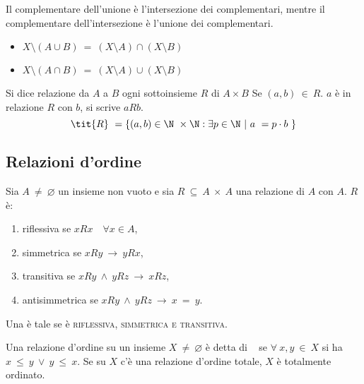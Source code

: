 \documentclass[../analisi.tex]{subfiles}
\begin{document}
\begin{esem}

Il complementare dell'unione è l'intersezione dei complementari, mentre il complementare dell'intersezione è l'unione dei complementari.

	\begin{itemize}
	\item $ X \setminus (A \cup B)\ =\ (X \setminus A) \cap(X \setminus B) $
	\item $ X \setminus (A \cap B)\ =\ (X \setminus A) \cup (X \setminus B) $
        \end{itemize}
\end{esem}

\begin{dimo}
	Si dice relazione da $A$ a $B$ ogni sottoinsieme $R$ di $A\times B$ Se $(a,b)\ \in\ R$.
	$a$ è in relazione $R$ con $b$, si scrive $aRb$. 
	\begin{equation} 
	\tit{R}\ = \{ (a,b) \in \N\ \times \N: \exists p \in \N\ |\ a\ = p \cdot b\ \}
	\end{equation}
\end{dimo}

\subsection{Relazioni d'ordine}
Sia $A\ \neq\ \varnothing$ un insieme non vuoto e sia $R\ \subseteq\ A\ \times\ A$ una relazione di $A$ con $A$. $R$ è:

\begin{enumerate}
	\item riflessiva se $xRx \quad \forall x \in A$,
	\item simmetrica se $xRy\ \rightarrow\ yRx$,
	\item transitiva se $xRy\ \land\ yRz\ \rightarrow\ xRz$,
	\item antisimmetrica se $xRy\ \land\ yRz\ \rightarrow\ x\ =\ y$.
\end{enumerate}
Una  è tale se è \textsc{riflessiva, simmetrica e transitiva}.

\begin{defn} 
 	Una relazione d'ordine su un insieme $X\ \neq \ \varnothing $ è detta di   se $\forall\ x,y\ \in\ X $ si ha $x\ \leq\ y\ \lor\ y\ \leq\ x$. Se su $X$ c'è una relazione d'ordine totale, $X$ è totalmente ordinato. 
\end{defn}
\end{document}
